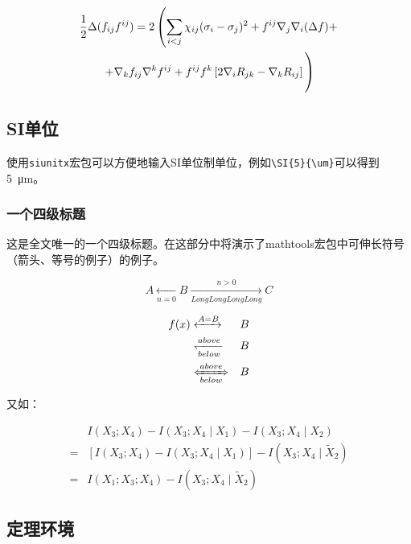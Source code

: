 \begin {multline}
  \frac {1}{2}\Delta (f_{ij}f^{ij})=
  2\left (\sum _{i<j}\chi _{ij}(\sigma _{i}-
    \sigma _{j}) ^{2}+ f^{ij}\nabla _{j}\nabla _{i}(\Delta f)+\right .\\
  \left .+\nabla _{k}f_{ij}\nabla ^{k}f^{ij}+
    f^{ij}f^{k}\left [2\nabla _{i}R_{jk}-
      \nabla _{k}R_{ij}\right ]\vphantom {\sum _{i<j}}\right )
\end{multline}

\subsection{SI单位}

使用\verb+siunitx+宏包可以方便地输入SI单位制单位，例如\verb+\SI{5}{\um}+可以得到\SI{5}{\um}。

\subsubsection{一个四级标题}
\label{sec:depth4}

这是全文唯一的一个四级标题。在这部分中将演示了mathtools宏包中可伸长符号（箭头、等号的例子）的例子。

\begin{displaymath}
    A \xleftarrow[n=0]{} B \xrightarrow[LongLongLongLong]{n>0} C 
\end{displaymath}

\begin{eqnarray}
  f(x) & \xleftrightarrow[]{A=B}  & B \\
  & \xleftharpoondown[below]{above} & B \nonumber \\
  & \xLeftrightarrow[below]{above} & B
\end{eqnarray}

又如：

\begin{align}
  \label{eq:none}
  & I(X_3;X_4)-I(X_3;X_4\mid{}X_1)-I(X_3;X_4\mid{}X_2) \nonumber \\
  = & [I(X_3;X_4)-I(X_3;X_4\mid{}X_1)]-I(X_3;X_4\mid{}\tilde{X}_2) \\
  = & I(X_1;X_3;X_4)-I(X_3;X_4\mid{}\tilde{X}_2)
\end{align}

\subsection{定理环境}

